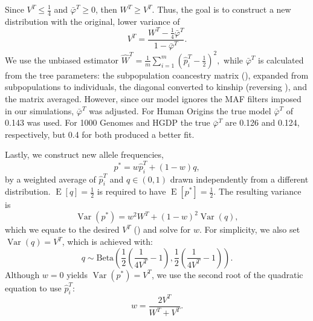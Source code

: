 \documentclass[9pt,lineno]{elife}
\DeclareMathOperator{\E}{E}
\DeclareMathOperator{\Var}{Var}
\newcommand{\pith}{\hat{p}_i^T}
\begin{document}
\begin{appendixbox}
  Since $V^T \le \frac{1}{4}$ and $\bar{\varphi}^T \ge 0$, then $W^T \ge V^T$.
  Thus, the goal is to construct a new distribution with the original, lower variance of
  \begin{equation}
    \label{eq:var_undiff}
    V^T
    =
    \frac{ W^T - \frac{1}{4} \bar{\varphi}^T }{ 1 - \bar{\varphi}^T }
    .
  \end{equation}
  We use the unbiased estimator
  $
  \hat{W}^T
  =
  \frac{1}{m} \sum_{i=1}^m \left( \pith - \frac{1}{2} \right)^2
  ,
  $
  while $\bar{\varphi}^T$ is calculated from the tree parameters: the subpopulation coancestry matrix (), expanded from subpopulations to individuals, the diagonal converted to kinship (reversing ), and the matrix averaged.
  However, since our model ignores the MAF filters imposed in our simulations, $\bar{\varphi}^T$ was adjusted.
  For Human Origins the true model $\bar{\varphi}^T$ of 0.143 was used.
  For 1000 Genomes and HGDP the true $\bar{\varphi}^T$ are 0.126 and 0.124, respectively, but 0.4 for both produced a better fit.

  Lastly, we construct new allele frequencies,
    $$
    p^* = w \pith + ( 1 - w ) q,
    $$
  by a weighted average of $\pith$ and $q \in (0, 1)$ drawn independently from a different distribution.
  $\E[q] = \frac{1}{2}$ is required to have $\E \left[ p^* \right] = \frac{1}{2}$.
  The resulting variance is
    $$
    \Var(p^*)
    =
    w^2 W^T + (1-w)^2 \Var(q)
    ,
    $$
  which we equate to the desired $V^T$ () and solve for $w$.
  For simplicity, we also set $\Var(q) = V^T$, which is achieved with:
    $$
    q \sim \text{Beta} \left( \frac{1}{2} \left( \frac{1}{ 4 V^T } - 1 \right), \frac{1}{2} \left( \frac{1}{ 4 V^T } - 1 \right) \right)
    .
    $$
  Although $w=0$ yields $\Var(p^*) = V^T$, we use the second root of the quadratic equation to use $\pith$:
    $$
    w = \frac{ 2 V^T }{ W^T + V^T }.
    $$

\end{appendixbox}
\end{document}
